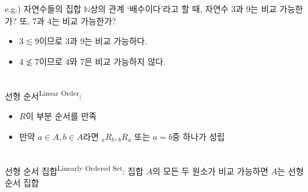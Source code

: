 e.g.) 자연수들의 집합 $\mathbb{N}$상의 관계 `  배수이다'라고 할 때, 자연수 3과 9는 비교 가능한가?
또, 7과 4는 비교 가능한가?
\begin{itemize}
    \item $3 \lesssim 9$이므로 3과 9는 비교 가능하다.
    \item $4 \not\lesssim 7$이므로 4와 7은 비교 가능하지 않다.
\end{itemize}\phantom{}\\
선형 순서\textsuperscript{Linear Order}:
\begin{itemize}
    \item $R$이 부분 순서를 만족
    \item 만약 $a \in A, b \in A$라면 $_aR_b,{_bR_a}$ 또는 $a = b$중 하나가 성립
\end{itemize}\phantom{}\\
선형 순서 집합\textsuperscript{Linearly Ordered Set}: 집합 $A$의 모든 두 원소가 비교 가능하면 $A$는 선형 순서 집합

